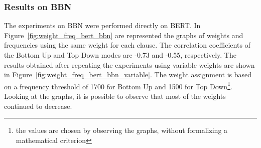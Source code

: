 \subsubsection{Results on BBN}
The experiments on BBN were performed directly on BERT. In Figure~\ref{fig:weight_freq_bert_bbn} are represented the graphs of weights and frequencies using the same weight for each clause. The correlation coefficients of the Bottom Up and Top Down modes are -0.73 and -0.55, respectively. The results obtained after repeating the experiments using variable weights are shown in Figure~\ref{fig:weight_freq_bert_bbn_variable}. The weight assignment is based on a frequency threshold of 1700 for Bottom Up and 1500 for Top Down\footnote{the values are chosen by observing the graphs, without formalizing a mathematical criterion}. Looking at the graphs, it is possible to observe that most of the weights continued to decrease.

